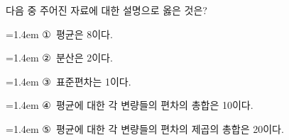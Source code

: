다음 중 주어진 자료에 대한 설명으로 옳은 것은? 
\par\medskip\par\noindent\hangindent=1.4em {\small ①}\ 평균은 8이다.\par\noindent\hangindent=1.4em {\small ②}\ 분산은 2이다.\par\noindent\hangindent=1.4em {\small ③}\ 표준편차는 1이다.\par\noindent\hangindent=1.4em {\small ④}\ 평균에 대한 각 변량들의 편차의 총합은 10이다.\par\noindent\hangindent=1.4em {\small ⑤}\ 평균에 대한 각 변량들의 편차의 제곱의 총합은 20이다.\par\medskip
